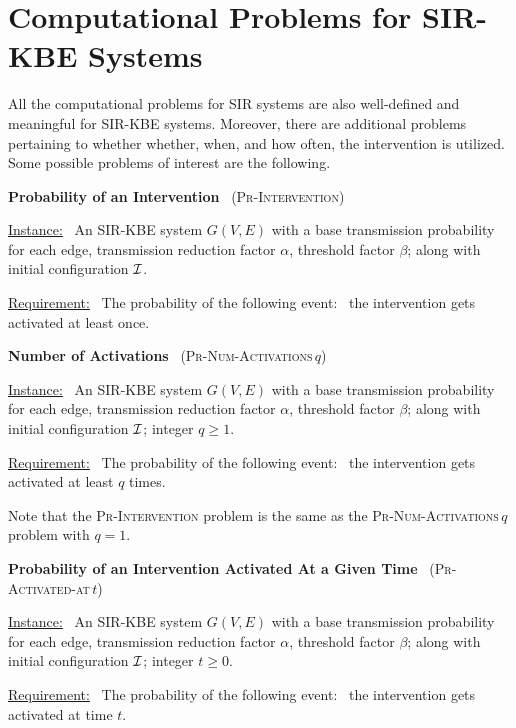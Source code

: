 \documentclass[11pt]{article}
\newcommand{\cali}{\mbox{${\cal I}$}}
\newcommand{\Int}{\textsc{Pr-Intervention}}
\newcommand{\tActivatedAt}{\mbox{\textsc{Pr-Activated-at}$\,t$}}
\newcommand{\NumActivations}{\mbox{\textsc{Pr-Num-Activations}$\,q$}}
\begin{document}
\section{Computational Problems for SIR-KBE Systems}
\label{sec:computational_problems}

All the computational problems for SIR systems 
are also well-defined and meaningful for SIR-KBE systems.
Moreover, there are additional problems pertaining to whether whether, when, and how often,
the intervention is utilized. Some possible problems of interest are the following.

\bigskip

\noindent
\textbf{Probability of an Intervention}~ (\Int)

\medskip
\noindent
\underline{Instance:}~ An SIR-KBE system $G(V,E)$ with a base transmission probability for each edge,
transmission reduction factor $\alpha$, threshold factor $\beta$;
along with initial configuration \cali.

\smallskip
\noindent
\underline{Requirement:}~ The probability of the following
event:~ the intervention gets activated at least once.

\bigskip
\noindent
\textbf{Number of Activations}~ (\NumActivations)

\medskip
\noindent
\underline{Instance:}~ An SIR-KBE system $G(V,E)$ with a base transmission probability for each edge,
transmission reduction factor $\alpha$, threshold factor $\beta$;
along with initial configuration \cali; integer $q \geq 1$.

\smallskip
\noindent
\underline{Requirement:}~ The probability of the following
event:~ the intervention gets activated at least $q$ times.

\medskip
Note that the \Int{} problem is the same as the \NumActivations{} problem with $q = 1$.

\bigskip

\noindent
\textbf{Probability of an Intervention Activated At a Given Time}~ (\tActivatedAt)

\medskip
\noindent
\underline{Instance:}~ An SIR-KBE system $G(V,E)$ with a base transmission probability for each edge,
transmission reduction factor $\alpha$, threshold factor $\beta$;
along with initial configuration \cali; integer $t \geq 0$.

\smallskip
\noindent
\underline{Requirement:}~ The probability of the following
event:~ the intervention gets activated at time $t$.

\bigskip
\end{document}
